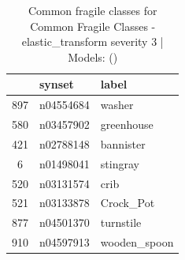 \begin{table}
\caption{Common fragile classes for Common Fragile Classes - elastic_transform severity 3 | Models: ()}
\label{tab:Common Fragile Classes - elastic_transform severity 3_d41d8cd9}
\begin{tabular}{cll}
\toprule
 & synset & label \\
\midrule
897 & n04554684 & washer \\
580 & n03457902 & greenhouse \\
421 & n02788148 & bannister \\
6 & n01498041 & stingray \\
520 & n03131574 & crib \\
521 & n03133878 & Crock_Pot \\
877 & n04501370 & turnstile \\
910 & n04597913 & wooden_spoon \\
\bottomrule
\end{tabular}
\end{table}

